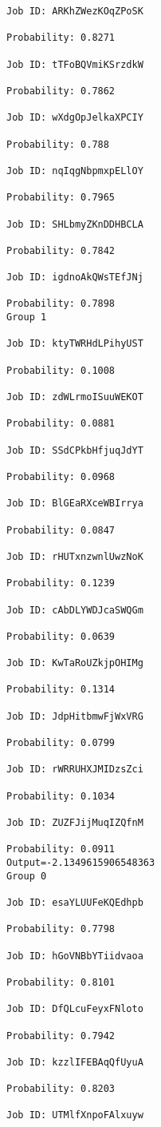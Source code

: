 \documentclass[11pt]{article}
\begin{document}
\begin{Verbatim}[commandchars=\\\{\}]
Job ID: ARKhZWezKOqZPoSK

Probability: 0.8271

Job ID: tTFoBQVmiKSrzdkW

Probability: 0.7862

Job ID: wXdgOpJelkaXPCIY

Probability: 0.788

Job ID: nqIqgNbpmxpELlOY

Probability: 0.7965

Job ID: SHLbmyZKnDDHBCLA

Probability: 0.7842

Job ID: igdnoAkQWsTEfJNj

Probability: 0.7898
Group 1

Job ID: ktyTWRHdLPihyUST

Probability: 0.1008

Job ID: zdWLrmoISuuWEKOT

Probability: 0.0881

Job ID: SSdCPkbHfjuqJdYT

Probability: 0.0968

Job ID: BlGEaRXceWBIrrya

Probability: 0.0847

Job ID: rHUTxnzwnlUwzNoK

Probability: 0.1239

Job ID: cAbDLYWDJcaSWQGm

Probability: 0.0639

Job ID: KwTaRoUZkjpOHIMg

Probability: 0.1314

Job ID: JdpHitbmwFjWxVRG

Probability: 0.0799

Job ID: rWRRUHXJMIDzsZci

Probability: 0.1034

Job ID: ZUZFJijMuqIZQfnM

Probability: 0.0911
Output=-2.1349615906548363
Group 0

Job ID: esaYLUUFeKQEdhpb

Probability: 0.7798

Job ID: hGoVNBbYTiidvaoa

Probability: 0.8101

Job ID: DfQLcuFeyxFNloto

Probability: 0.7942

Job ID: kzzlIFEBAqQfUyuA

Probability: 0.8203

Job ID: UTMlfXnpoFAlxuyw


\end{Verbatim}
\end{document}
